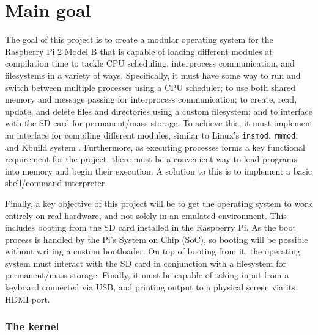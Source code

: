 \documentclass[10pt,a4paper]{article}
\newcommand{\code}[1]{\texttt{#1}}
\begin{document}
\section*{Main goal}
The goal of this project is to create a modular operating system for the
Raspberry Pi 2 Model B that is capable of loading different modules at
compilation time to tackle CPU scheduling, interprocess communication, and
filesystems in a variety of ways. Specifically, it must have some way to run and
switch between multiple processes using a CPU scheduler; to use both shared
memory and message passing for interprocess communication; to
create, read, update, and delete files and directories using a custom
filesystem; and to interface with the SD card for permanent/mass storage.  To
achieve this, it must implement an interface for compiling different modules,
similar to Linux's \code{insmod}, \code{rmmod}, and Kbuild system \cite{insmod,
Kbuild}.  Furthermore, as executing processes forms a key functional requirement
for the project, there must be a convenient way to load programs into memory and
begin their execution. A solution to this is to implement a basic shell/command
interpreter.

Finally, a key objective of this project will be to get the operating system to
work entirely on real hardware, and not solely in an emulated environment. This
includes booting from the SD card installed in the Raspberry Pi. As the boot
process is handled by the Pi's System on Chip (SoC), so booting will be possible
without writing a custom bootloader. On top of booting from it, the operating
system must interact with the SD card in conjunction with a filesystem for
permanent/mass storage. Finally, it must be capable of taking input from a
keyboard connected via USB, and printing output to a physical screen via its
HDMI port.

\subsubsection*{The kernel}
\end{document}
